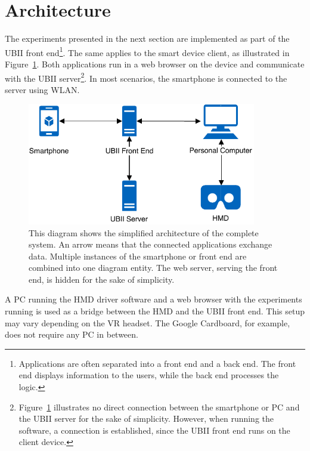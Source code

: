 \section{Architecture}\label{section:architecture}

The experiments presented in the next section are implemented as part of the \gls{UBII} front end\footnote{Applications are often separated into a front end and a back end. The front end displays information to the users, while the back end processes the logic.}. The same applies to the smart device client, as illustrated in Figure~\ref{fig:architecture}. Both applications run in a web browser on the device and communicate with the \gls{UBII} server\footnote{Figure~\ref{fig:architecture} illustrates no direct connection between the smartphone or \gls{PC} and the \gls{UBII} server for the sake of simplicity. However, when running the software, a connection is established, since the \gls{UBII} front end runs on the client device.}. In most scenarios, the smartphone is connected to the server using \gls{WLAN}.

\begin{figure}[H]
  \centering
  \includegraphics[width=10cm]{figures/implementation/architecture.pdf}
  \caption[System architecture]{This diagram shows the simplified architecture of the complete system. An arrow means that the connected applications exchange data. Multiple instances of the smartphone or front end are combined into one diagram entity. The web server, serving the front end, is hidden for the sake of simplicity.}\label{fig:architecture}
\end{figure}

A \gls{PC} running the \gls{HMD} driver software and a web browser with the experiments running is used as a bridge between the \gls{HMD} and the \gls{UBII} front end. This setup may vary depending on the \gls{VR} headset. The Google Cardboard, for example, does not require any \gls{PC} in between.

